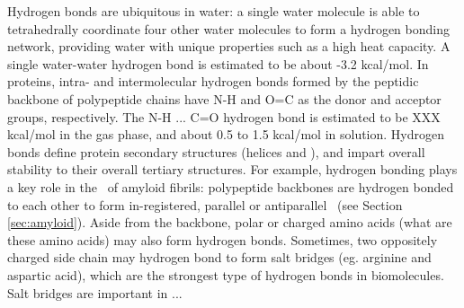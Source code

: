 Hydrogen bonds are ubiquitous in water: a single water molecule is able to tetrahedrally coordinate four other water molecules to form a hydrogen bonding network, providing water with unique properties such as a high heat capacity. A single water-water hydrogen bond is estimated to be about -3.2 kcal/mol.\cite{where did I see this} In proteins, intra- and intermolecular hydrogen bonds formed by the peptidic backbone of polypeptide chains have N-H and O=C as the donor and acceptor groups, respectively. The N-H ... C=O hydrogen bond is estimated to be XXX kcal/mol in the gas phase, and about 0.5 to 1.5 kcal/mol in solution.\cite{energetics of hydrogen bonds in peptides} Hydrogen bonds define protein secondary structures (helices and \bsheets), and impart overall stability to their overall tertiary structures.\cite{refs} For example, hydrogen bonding plays a key role in the \crossbs\ of amyloid fibrils: polypeptide backbones are hydrogen bonded to each other to form in-registered, parallel or antiparallel \bsheets\ (see Section \ref{sec:amyloid}). Aside from the backbone, polar or charged amino acids (what are these amino acids) may also form hydrogen bonds. Sometimes, two oppositely charged side chain may hydrogen bond to form salt bridges (eg. arginine and aspartic acid), which are the strongest type of hydrogen bonds in biomolecules. Salt bridges are important in ...




